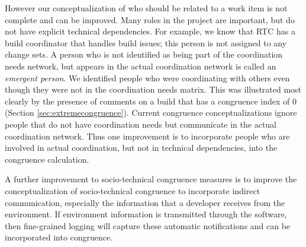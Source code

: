 



However our conceptualization of who should be related to a work item is not complete and can be improved.
Many roles in the project are important, but do not have explicit technical dependencies.
For example, we know that RTC has a build coordinator that handles build issues; this person is not assigned to any change sets.
A person who is not identified as being part of the coordination needs network, but appears in the actual coordination network is called an \emph{emergent person}\cite{damian2007:collaboration}.
We identified people who were coordinating with others even though they were not in the coordination needs matrix.
This was illustrated most clearly by the presence of comments on a build that has a congruence index of 0 (Section \ref{sec:extremecongruence}).
Current congruence conceptualizations ignore people that do not have coordination needs but communicate in the actual coordination network.
Thus one improvement is to incorporate people who are involved in actual coordination, but not in technical dependencies, into the congruence calculation. 

A further improvement to socio-technical congruence measures is to improve the
conceptualization of socio-technical congruence to incorporate indirect
communication, especially the information that a developer receives from the
environment. If environment information is transmitted through the software, then fine-grained logging will capture these automatic notifications and can be incorporated into congruence.

